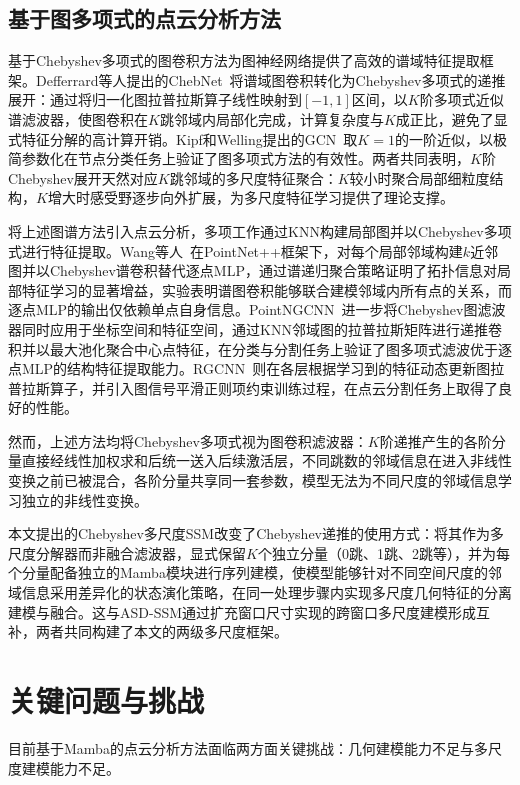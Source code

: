 \documentclass[12pt,a4paper,openany,oneside]{ctexbook}
\theoremstyle{definition}
\theoremstyle{remark}
\begin{document}
\subsection{基于图多项式的点云分析方法}
基于Chebyshev多项式的图卷积方法为图神经网络提供了高效的谱域特征提取框架。Defferrard等人提出的ChebNet~\cite{chebnet}将谱域图卷积转化为Chebyshev多项式的递推展开：通过将归一化图拉普拉斯算子线性映射到$[-1,1]$区间，以$K$阶多项式近似谱滤波器，使图卷积在$K$跳邻域内局部化完成，计算复杂度与$K$成正比，避免了显式特征分解的高计算开销。Kipf和Welling提出的GCN~\cite{gcn}取$K=1$的一阶近似，以极简参数化在节点分类任务上验证了图多项式方法的有效性。两者共同表明，$K$阶Chebyshev展开天然对应$K$跳邻域的多尺度特征聚合：$K$较小时聚合局部细粒度结构，$K$增大时感受野逐步向外扩展，为多尺度特征学习提供了理论支撑。

将上述图谱方法引入点云分析，多项工作通过KNN构建局部图并以Chebyshev多项式进行特征提取。Wang等人~\cite{localspecgcn}在PointNet++框架下，对每个局部邻域构建$k$近邻图并以Chebyshev谱卷积替代逐点MLP，通过谱递归聚合策略证明了拓扑信息对局部特征学习的显著增益，实验表明谱图卷积能够联合建模邻域内所有点的关系，而逐点MLP的输出仅依赖单点自身信息。PointNGCNN~\cite{pointngcnn}进一步将Chebyshev图滤波器同时应用于坐标空间和特征空间，通过KNN邻域图的拉普拉斯矩阵进行递推卷积并以最大池化聚合中心点特征，在分类与分割任务上验证了图多项式滤波优于逐点MLP的结构特征提取能力。RGCNN~\cite{rgcnn}则在各层根据学习到的特征动态更新图拉普拉斯算子，并引入图信号平滑正则项约束训练过程，在点云分割任务上取得了良好的性能。

然而，上述方法均将Chebyshev多项式视为图卷积滤波器：$K$阶递推产生的各阶分量直接经线性加权求和后统一送入后续激活层，不同跳数的邻域信息在进入非线性变换之前已被混合，各阶分量共享同一套参数，模型无法为不同尺度的邻域信息学习独立的非线性变换。

本文提出的Chebyshev多尺度SSM改变了Chebyshev递推的使用方式：将其作为多尺度分解器而非融合滤波器，显式保留$K$个独立分量（0跳、1跳、2跳等），并为每个分量配备独立的Mamba模块进行序列建模，使模型能够针对不同空间尺度的邻域信息采用差异化的状态演化策略，在同一处理步骤内实现多尺度几何特征的分离建模与融合。这与ASD-SSM通过扩充窗口尺寸实现的跨窗口多尺度建模形成互补，两者共同构建了本文的两级多尺度框架。

\section{关键问题与挑战}
目前基于Mamba的点云分析方法面临两方面关键挑战：几何建模能力不足与多尺度建模能力不足。
\end{document}
